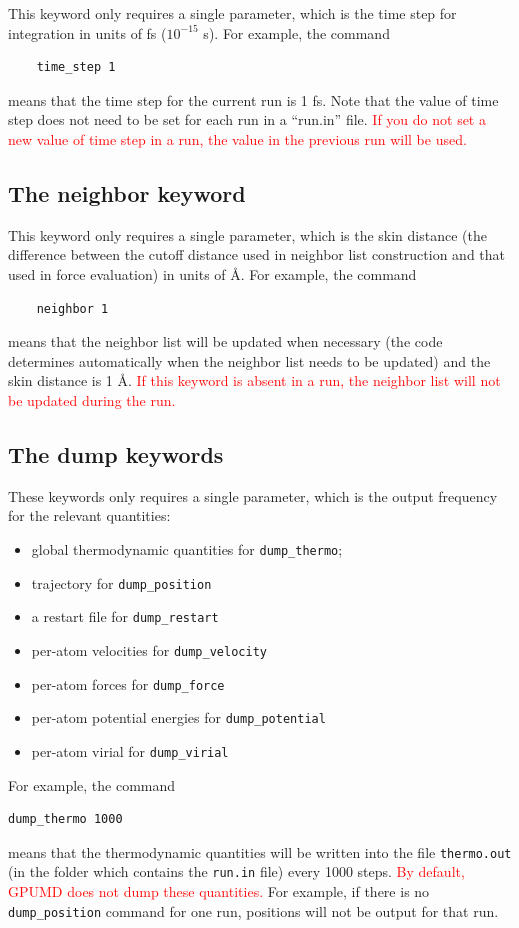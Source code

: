\documentclass[12pt,a4paper]{report}
\begin{document}
This keyword only requires a single parameter, which is the time step for integration in units of fs ($10^{-15}$ s). For example, the command
\begin{verbatim}
    time_step 1
\end{verbatim}
means that the time step for the current run is 1 fs. Note that the value of time step does not need to be set for each run in a ``run.in'' file. \textcolor{red}{If you do not set a new value of time step in a run, the value in the previous run will be used.}



\subsection{The neighbor keyword}

This keyword only requires a single parameter, which is the skin distance (the difference between the cutoff distance used in neighbor list construction and that used in force evaluation) in units of \AA. For example, the command
\begin{verbatim}
    neighbor 1
\end{verbatim}
means that the neighbor list will be updated when necessary (the code determines automatically when the neighbor list needs to be updated) and the skin distance is 1 \AA. \textcolor{red}{If this keyword is absent in a run, the neighbor list will not be updated during the run.}


\subsection{The dump keywords}

These keywords only requires a single parameter, which is the output frequency for the relevant quantities: 
\begin{itemize}
\item global thermodynamic quantities for \verb"dump_thermo";
\item trajectory for  \verb"dump_position"
\item a restart file for  \verb"dump_restart"
\item per-atom velocities for \verb"dump_velocity"
\item per-atom forces for \verb"dump_force"
\item per-atom  potential energies for \verb"dump_potential"
\item per-atom virial for \verb"dump_virial"
\end{itemize}
For example, the command
\begin{verbatim}
dump_thermo 1000
\end{verbatim}
means that the thermodynamic quantities will be written into the file \verb"thermo.out" (in the folder which contains the \verb"run.in" file) every 1000 steps.
\textcolor{red}{By default, GPUMD does not dump these quantities.} For example, if there is no \verb"dump_position" command for one run, positions will not be output for that run.
\end{document}
